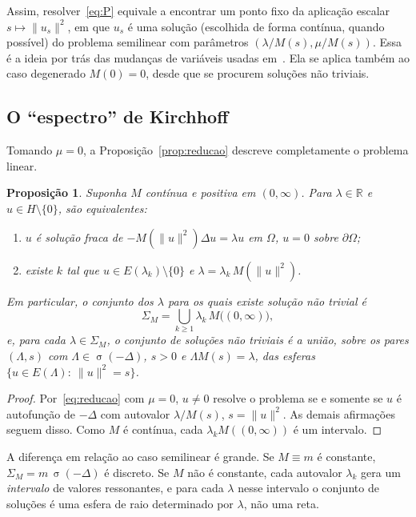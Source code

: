 \documentclass[11pt,a4paper]{article}
\theoremstyle{plain}
\newtheorem{proposicao}[teorema]{Proposição}
\theoremstyle{definition}
\theoremstyle{remark}
\newcommand{\R}{\mathbb{R}}
\newcommand{\norm}[1]{\lVert #1\rVert}
\DeclareMathOperator{\spec}{\sigma}
\begin{document}
Assim, resolver~\eqref{eq:P} equivale a encontrar um ponto fixo da aplicação
escalar $s\mapsto\norm{u_s}^2$, em que $u_s$ é uma solução (escolhida de forma
contínua, quando possível) do problema semilinear com parâmetros
$(\lambda/M(s),\mu/M(s))$. Essa é a ideia por trás das mudanças de variáveis
usadas em~\cite{CintraEtAl2020,SantosJuniorSiciliano2018}. Ela se aplica também
ao caso degenerado $M(0)=0$, desde que se procurem soluções não triviais.

\subsection{O ``espectro'' de Kirchhoff}

Tomando $\mu=0$, a Proposição~\ref{prop:reducao} descreve completamente o
problema linear.

\begin{proposicao}\label{prop:espectro}
Suponha $M$ contínua e positiva em $(0,\infty)$. Para $\lambda\in\R$ e
$u\in H\setminus\{0\}$, são equivalentes:
\begin{enumerate}[label=(\roman*)]
\item $u$ é solução fraca de $-M(\norm{u}^2)\Delta u=\lambda u$ em $\Omega$,
$u=0$ sobre $\partial\Omega$;
\item existe $k$ tal que $u\in E(\lambda_k)\setminus\{0\}$ e
$\lambda=\lambda_k\,M(\norm{u}^2)$.
\end{enumerate}
Em particular, o conjunto dos $\lambda$ para os quais existe solução não trivial é
\begin{equation}\label{eq:espectro}
\Sigma_M=\bigcup_{k\ge1}\lambda_k\,M\bigl((0,\infty)\bigr),
\end{equation}
e, para cada $\lambda\in\Sigma_M$, o conjunto de soluções não triviais é a união,
sobre os pares $(\Lambda,s)$ com $\Lambda\in\spec(-\Delta)$, $s>0$ e
$\Lambda M(s)=\lambda$, das esferas
$\{u\in E(\Lambda):\ \norm{u}^2=s\}$.
\end{proposicao}

\begin{proof}
Por~\eqref{eq:reducao} com $\mu=0$, $u\ne0$ resolve o problema se e somente se
$u$ é autofunção de $-\Delta$ com autovalor $\lambda/M(s)$, $s=\norm{u}^2$. As
demais afirmações seguem disso. Como $M$ é contínua, cada
$\lambda_kM((0,\infty))$ é um intervalo.
\end{proof}

A diferença em relação ao caso semilinear é grande. Se $M\equiv m$ é
constante, $\Sigma_M=m\,\spec(-\Delta)$ é discreto. Se $M$ não é constante,
cada autovalor $\lambda_k$ gera um \emph{intervalo} de valores ressonantes, e
para cada $\lambda$ nesse intervalo o conjunto de soluções é uma esfera de raio
determinado por $\lambda$, não uma reta.
\end{document}
